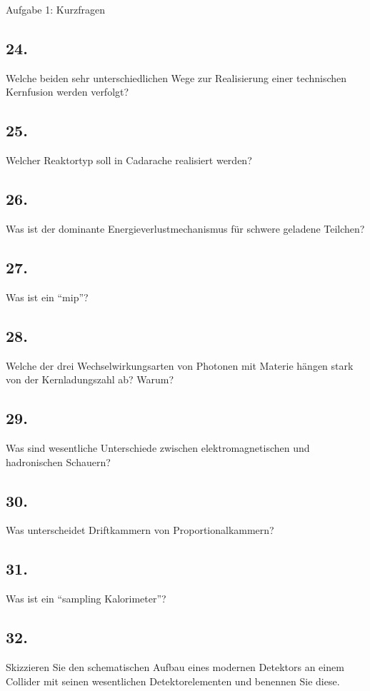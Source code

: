 \begin{aufgabe}{Aufgabe 1: Kurzfragen}
    \subsection{24.}
    Welche beiden sehr unterschiedlichen Wege zur Realisierung einer technischen Kernfusion werden verfolgt?

    \subsection{25.}
    Welcher Reaktortyp soll in Cadarache realisiert werden?

    \subsection{26.}
    Was ist der dominante Energieverlustmechanismus für schwere geladene Teilchen?

    \subsection{27.}
    Was ist ein \enquote{mip}?

    \subsection{28.}
    Welche der drei Wechselwirkungsarten von Photonen mit Materie hängen stark von der Kernladungszahl ab?
    Warum?

    \subsection{29.}
    Was sind wesentliche Unterschiede zwischen elektromagnetischen und hadronischen Schauern?

    \subsection{30.}
    Was unterscheidet Driftkammern von Proportionalkammern?

    \subsection{31.}
    Was ist ein \enquote{sampling Kalorimeter}?

    \subsection{32.}
    Skizzieren Sie den schematischen Aufbau eines modernen Detektors an einem Collider mit seinen wesentlichen Detektorelementen
    und benennen Sie diese.


\end{aufgabe}

